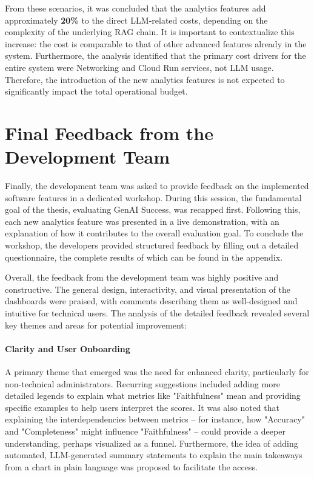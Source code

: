 \documentclass[
	english,
	ruledheaders=section,%
	class=report,%
	thesis={type=bachelor},%
	accentcolor=1b,%
	custommargins=true,%
	marginpar=false,%
	parskip=half-,%
	fontsize=11pt,%
	DIV=14,
]{tudapub}
\begin{document}
From these scenarios, it was concluded that the analytics features add approximately \textbf{20\%} to the direct LLM-related costs, depending on the complexity of the underlying RAG chain. It is important to contextualize this increase: the cost is comparable to that of other advanced features already in the system. Furthermore, the analysis identified that the primary cost drivers for the entire system were Networking and Cloud Run services, not LLM usage. Therefore, the introduction of the new analytics features is not expected to significantly impact the total operational budget.

\section{Final Feedback from the Development Team}
Finally, the development team was asked to provide feedback on the implemented software features in a dedicated workshop. During this session, the fundamental goal of the thesis, evaluating GenAI Success, was recapped first. Following this, each new analytics feature was presented in a live demonstration, with an explanation of how it contributes to the overall evaluation goal. To conclude the workshop, the developers provided structured feedback by filling out a detailed questionnaire, the complete results of which can be found in the appendix.

Overall, the feedback from the development team was highly positive and constructive. The general design, interactivity, and visual presentation of the dashboards were praised, with comments describing them as well-designed and intuitive for technical users. The analysis of the detailed feedback revealed several key themes and areas for potential improvement:

\paragraph{Clarity and User Onboarding} A primary theme that emerged was the need for enhanced clarity, particularly for non-technical administrators. Recurring suggestions included adding more detailed legends to explain what metrics like "Faithfulness" mean and providing specific examples to help users interpret the scores. It was also noted that explaining the interdependencies between metrics -- for instance, how "Accuracy" and "Completeness" might influence "Faithfulness" -- could provide a deeper understanding, perhaps visualized as a funnel. Furthermore, the idea of adding automated, LLM-generated summary statements to explain the main takeaways from a chart in plain language was proposed to facilitate the access.
\end{document}
